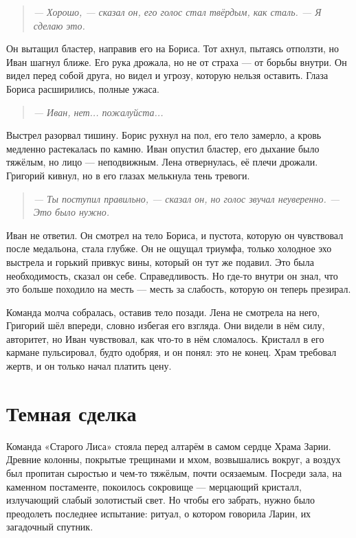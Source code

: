 \documentclass[12pt,a4paper]{book} %
\newenvironment{dialogue}{\begin{quote}\itshape}{\end{quote}}
\begin{document}
\begin{dialogue}
--- Хорошо, --- сказал он, его голос стал твёрдым, как сталь. --- Я сделаю это.
\end{dialogue}

Он вытащил бластер, направив его на Бориса. Тот ахнул, пытаясь отползти, но Иван шагнул ближе. Его рука дрожала, но не от страха --- от борьбы внутри. Он видел перед собой друга, но видел и угрозу, которую нельзя оставить. Глаза Бориса расширились, полные ужаса.

\begin{dialogue}
--- Иван, нет... пожалуйста...
\end{dialogue}

Выстрел разорвал тишину. Борис рухнул на пол, его тело замерло, а кровь медленно растекалась по камню. Иван опустил бластер, его дыхание было тяжёлым, но лицо --- неподвижным. Лена отвернулась, её плечи дрожали. Григорий кивнул, но в его глазах мелькнула тень тревоги.

\begin{dialogue}
--- Ты поступил правильно, --- сказал он, но голос звучал неуверенно. --- Это было нужно.
\end{dialogue}

Иван не ответил. Он смотрел на тело Бориса, и пустота, которую он чувствовал после медальона, стала глубже. Он не ощущал триумфа, только холодное эхо выстрела и горький привкус вины, который он тут же подавил. Это была необходимость, сказал он себе. Справедливость. Но где-то внутри он знал, что это больше походило на месть --- месть за слабость, которую он теперь презирал.

Команда молча собралась, оставив тело позади. Лена не смотрела на него, Григорий шёл впереди, словно избегая его взгляда. Они видели в нём силу, авторитет, но Иван чувствовал, как что-то в нём сломалось. Кристалл в его кармане пульсировал, будто одобряя, и он понял: это не конец. Храм требовал жертв, и он только начал платить цену.

\chapter{Темная сделка}

Команда «Старого Лиса» стояла перед алтарём в самом сердце Храма Зарии. Древние колонны, покрытые трещинами и мхом, возвышались вокруг, а воздух был пропитан сыростью и чем-то тяжёлым, почти осязаемым. Посреди зала, на каменном постаменте, покоилось сокровище --- мерцающий кристалл, излучающий слабый золотистый свет. Но чтобы его забрать, нужно было преодолеть последнее испытание: ритуал, о котором говорила Ларин, их загадочный спутник.
\end{document}
